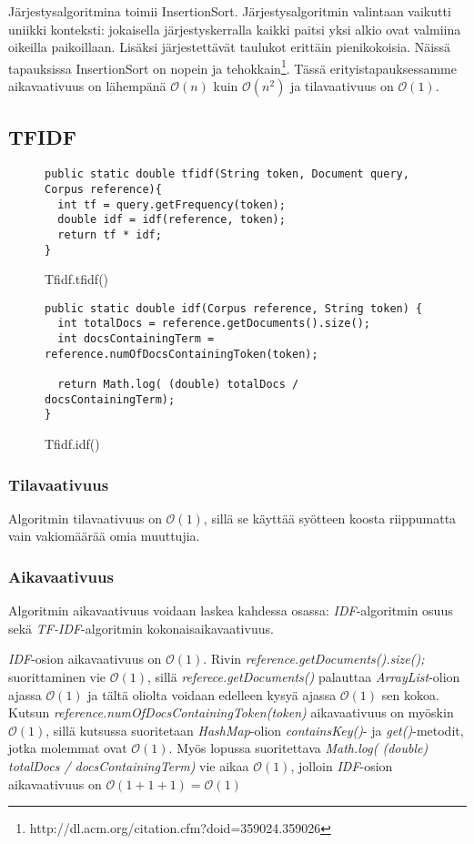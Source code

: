 \documentclass[12pt,a4paper]{article}
\begin{document}
Järjestysalgoritmina toimii InsertionSort. Järjestysalgoritmin valintaan vaikutti uniikki konteksti: jokaisella järjestyskerralla kaikki paitsi yksi alkio ovat valmiina oikeilla paikoillaan. Lisäksi järjestettävät taulukot erittäin pienikokoisia. Näissä tapauksissa InsertionSort on nopein ja tehokkain\footnote{http://dl.acm.org/citation.cfm?doid=359024.359026}. Tässä erityistapauksessamme aikavaativuus on lähempänä $\mathcal{O}(n)$ kuin $\mathcal{O}(n^2)$ ja tilavaativuus on $\mathcal{O}(1)$.


\subsection{TFIDF}

\begin{figure}[H]
\begin{lstlisting}
public static double tfidf(String token, Document query, Corpus reference){
  int tf = query.getFrequency(token); 
  double idf = idf(reference, token);
  return tf * idf;
}
\end{lstlisting}
\caption{Tfidf.tfidf()}
\end{figure}

\begin{figure}[H]
\begin{lstlisting}
public static double idf(Corpus reference, String token) {
  int totalDocs = reference.getDocuments().size();
  int docsContainingTerm = reference.numOfDocsContainingToken(token);
        
  return Math.log( (double) totalDocs / docsContainingTerm);
}
\end{lstlisting}
\caption{Tfidf.idf()}
\end{figure}

\subsubsection*{Tilavaativuus}
Algoritmin tilavaativuus on $\mathcal{O}(1)$, sillä se käyttää syötteen koosta riippumatta vain vakiomäärää omia muuttujia.

\subsubsection*{Aikavaativuus}
Algoritmin aikavaativuus voidaan laskea kahdessa osassa: \textit{IDF}-algoritmin osuus sekä \textit{TF-IDF}-algoritmin kokonaisaikavaativuus.

\textit{IDF}-osion aikavaativuus on $\mathcal{O}(1)$. Rivin \textit{reference.getDocuments().size();} suorittaminen vie $\mathcal{O}(1)$, sillä \textit{referece.getDocuments()} palauttaa \textit{ArrayList}-olion ajassa $\mathcal{O}(1)$ ja tältä oliolta voidaan edelleen kysyä ajassa $\mathcal{O}(1)$ sen kokoa. Kutsun \textit{reference.numOfDocsContainingToken(token)} aikavaativuus on myöskin $\mathcal{O}(1)$, sillä kutsussa suoritetaan \textit{HashMap}-olion \textit{containsKey()}- ja \textit{get()}-metodit, jotka molemmat ovat $\mathcal{O}(1)$. Myös lopussa suoritettava \textit{Math.log( (double) totalDocs / docsContainingTerm)} vie aikaa $\mathcal{O}(1)$, jolloin \textit{IDF}-osion aikavaativuus on $\mathcal{O}(1+1+1) = \mathcal{O}(1)$
\end{document}
